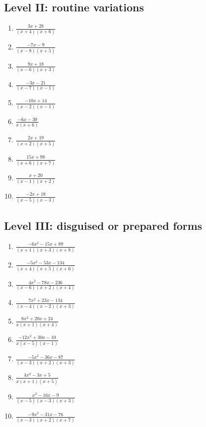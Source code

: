 \documentclass[11pt,oneside]{book}
\begin{document}
\subsection*{Level II: routine variations}
\begin{enumerate}[leftmargin=*,label=\textbf{\arabic*.},itemsep=0.65\baselineskip]
\item $\displaystyle \frac{3 x + 28}{\left(x + 4\right) \left(x + 6\right)}$
\item $\displaystyle \frac{- 7 x - 9}{\left(x - 8\right) \left(x + 5\right)}$
\item $\displaystyle \frac{9 x + 18}{\left(x - 6\right) \left(x + 3\right)}$
\item $\displaystyle \frac{- 3 x - 21}{\left(x - 7\right) \left(x - 1\right)}$
\item $\displaystyle \frac{- 10 x + 14}{\left(x - 2\right) \left(x - 1\right)}$
\item $\displaystyle \frac{- 6 x - 30}{x \left(x + 6\right)}$
\item $\displaystyle \frac{2 x + 19}{\left(x + 2\right) \left(x + 5\right)}$
\item $\displaystyle \frac{15 x + 98}{\left(x + 6\right) \left(x + 7\right)}$
\item $\displaystyle \frac{x + 20}{\left(x - 1\right) \left(x + 2\right)}$
\item $\displaystyle \frac{- 2 x + 18}{\left(x - 5\right) \left(x - 3\right)}$
\end{enumerate}
\subsection*{Level III: disguised or prepared forms}
\begin{enumerate}[leftmargin=*,label=\textbf{\arabic*.},itemsep=0.65\baselineskip]
\item $\displaystyle \frac{- 6 x^{2} - 15 x + 89}{\left(x + 1\right) \left(x + 3\right) \left(x + 8\right)}$
\item $\displaystyle \frac{- 5 x^{2} - 53 x - 134}{\left(x + 4\right) \left(x + 5\right) \left(x + 6\right)}$
\item $\displaystyle \frac{4 x^{2} - 78 x - 236}{\left(x - 6\right) \left(x + 2\right) \left(x + 4\right)}$
\item $\displaystyle \frac{7 x^{2} + 23 x - 134}{\left(x - 4\right) \left(x - 2\right) \left(x + 3\right)}$
\item $\displaystyle \frac{8 x^{2} + 20 x + 24}{x \left(x + 1\right) \left(x + 4\right)}$
\item $\displaystyle \frac{- 12 x^{2} + 30 x - 10}{x \left(x - 5\right) \left(x - 1\right)}$
\item $\displaystyle \frac{- 5 x^{2} - 36 x - 87}{\left(x - 3\right) \left(x + 2\right) \left(x + 3\right)}$
\item $\displaystyle \frac{4 x^{2} - 3 x + 5}{x \left(x + 1\right) \left(x + 5\right)}$
\item $\displaystyle \frac{x^{2} - 16 x - 9}{\left(x - 5\right) \left(x - 3\right) \left(x + 3\right)}$
\item $\displaystyle \frac{- 9 x^{2} - 31 x - 76}{\left(x - 3\right) \left(x + 2\right) \left(x + 7\right)}$
\end{enumerate}
\end{document}
